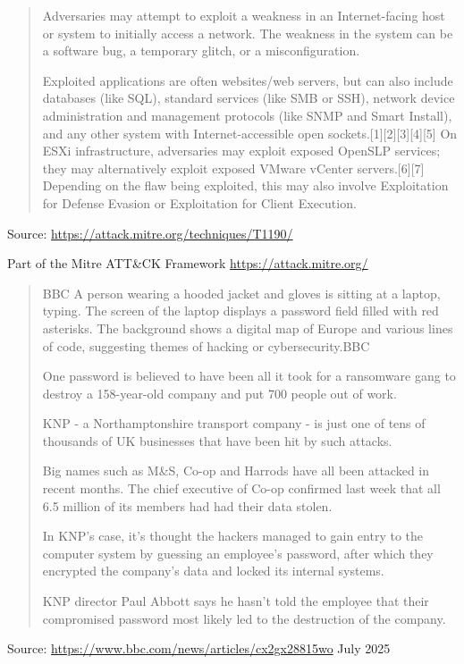 \documentclass[Screen16to9,17pt]{foils}
\begin{document}

\begin{quote}
Adversaries may attempt to exploit a weakness in an Internet-facing host or system to initially access a network. The weakness in the system can be a software bug, a temporary glitch, or a misconfiguration.

Exploited applications are often websites/web servers, but can also include databases (like SQL), standard services (like SMB or SSH), network device administration and management protocols (like SNMP and Smart Install), and any other system with Internet-accessible open sockets.[1][2][3][4][5] On ESXi infrastructure, adversaries may exploit exposed OpenSLP services; they may alternatively exploit exposed VMware vCenter servers.[6][7] Depending on the flaw being exploited, this may also involve Exploitation for Defense Evasion or Exploitation for Client Execution.
\end{quote}
Source: \url{https://attack.mitre.org/techniques/T1190/}


\begin{list2}
    \item Part of the Mitre ATT\&CK Framework \url{https://attack.mitre.org/}
\end{list2}




\begin{quote}
BBC A person wearing a hooded jacket and gloves is sitting at a laptop, typing. The screen of the laptop displays a password field filled with red asterisks. The background shows a digital map of Europe and various lines of code, suggesting themes of hacking or cybersecurity.BBC

One password is believed to have been all it took for a ransomware gang to destroy a 158-year-old company and put 700 people out of work.

KNP - a Northamptonshire transport company - is just one of tens of thousands of UK businesses that have been hit by such attacks.

Big names such as M\&S, Co-op and Harrods have all been attacked in recent months. The chief executive of Co-op confirmed last week that all 6.5 million of its members had had their data stolen.

In KNP's case, it's thought the hackers managed to gain entry to the computer system by guessing an employee's password, after which they encrypted the company's data and locked its internal systems.

KNP director Paul Abbott says he hasn't told the employee that their compromised password most likely led to the destruction of the company.
\end{quote}
Source: \url{https://www.bbc.com/news/articles/cx2gx28815wo} July 2025
\end{document}
